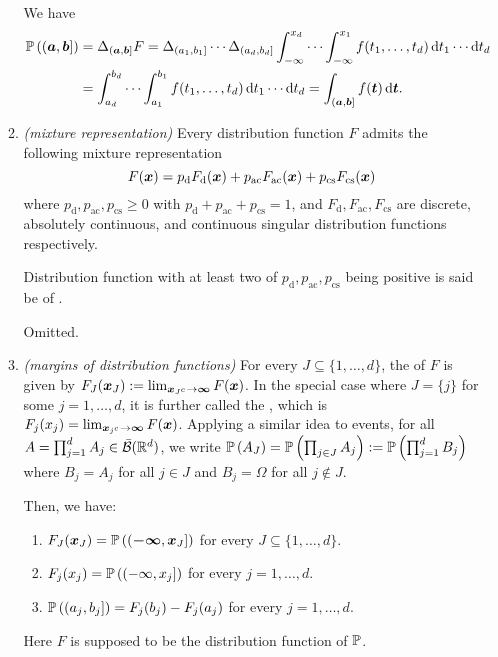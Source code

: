 \begin{enumerate}
\begin{enumerate}
\begin{pf}
We have
\begin{align*}
\prob{(\vect{a},\vect{b}]}
&=\Delta_{(\vect{a},\vect{b}]}F
=\Delta_{(a_1,b_1]}\cdots\Delta_{(a_d,b_d]}
\int_{-\infty}^{x_d}\dotsb\int_{-\infty}^{x_1}f(t_1,\dotsc,t_d)\odif{t_1}\cdots\odif{t_d} \\
&=\int_{a_d}^{b_d}\dotsb\int_{a_1}^{b_1}f(t_1,\dotsc,t_d)\odif{t_1}\cdots\odif{t_d}
=\int_{(\vect{a},\vect{b}]}^{}f(\vect{t})\odif{\vect{t}}.
\end{align*}
\end{pf}
\item \emph{(mixture representation)} Every distribution function \(F\) admits
the following mixture representation
\[
F(\bm{x})=p_{\mathrm{d}}F_{\mathrm{d}}(\bm{x})+
p_{\mathrm{ac}}F_{\mathrm{ac}}(\bm{x})+
p_{\mathrm{cs}}F_{\mathrm{cs}}(\bm{x})
\]
where \(p_{\mathrm{d}},p_{\mathrm{ac}},p_{\mathrm{cs}}\ge 0\) with
\(p_{\mathrm{d}}+p_{\mathrm{ac}}+p_{\mathrm{cs}}=1\), and
\(F_{\mathrm{d}},F_{\mathrm{ac}},F_{\mathrm{cs}}\) are discrete, absolutely
continuous, and continuous singular distribution functions respectively.
\begin{note}
Distribution function with at least two of
\(p_{\mathrm{d}},p_{\mathrm{ac}},p_{\mathrm{cs}}\) being positive is said be of
.
\end{note}

\begin{pf}
Omitted.
\end{pf}
\item \emph{(margins of distribution functions)} For every \(J\subseteq
\{1,\dotsc,d\}\), the  of \(F\) is given by
\(F_J(\bm{x}_J):=\lim_{\bm{x}_{J^c}\to\bm{\infty}}F(\bm{x})\).  In the
special case where \(J=\{j\}\) for some \(j=1,\dotsc,d\), it is further called
the , which is
\(F_j(x_j)=\lim_{\bm{x}_{j^c}\to\bm{\infty}}F(\bm{x})\). Applying a similar
idea to events, for all \(A=\prod_{j=1}^{d}A_j\in\bar{\mathcal{B}}(\mathbb{R}^d)\), we
write \(\mathbb{P}\left(A_J\right)=\mathbb{P}\left(\prod_{j\in J}A_j\right):=\mathbb{P}\left(\prod_{j=1}^{d}B_j\right)\)
where \(B_j=A_j\) for all \(j\in J\) and \(B_j=\Omega\) for all \(j\notin J\).

Then, we have:
\begin{enumerate}
\item \(F_J(\bm{x}_J)=\mathbb{P}\left((\bm{-\infty},\bm{x}_{J}]\right)\) for every
\(J\subseteq \{1,\dotsc,d\}\).
\item \(F_j(x_j)=\mathbb{P}\left((-\infty,x_{j}]\right)\) for every \(j=1,\dotsc,d\).
\item \(\mathbb{P}\left((a_j,b_j]\right)=F_{j}(b_j)-F_{j}(a_j)\) for every \(j=1,\dotsc,d\).
\end{enumerate}
Here \(F\) is supposed to be the distribution function of \(\mathbb{P}\).


\end{enumerate}
\end{enumerate}
